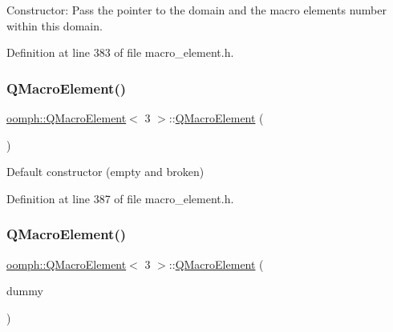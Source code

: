 Constructor\+: Pass the pointer to the domain and the macro element\textquotesingle{}s number within this domain. 



Definition at line 383 of file macro\+\_\+element.\+h.

\mbox{\label{classoomph_1_1QMacroElement_3_013_01_4_a52e55e172b74a1a9ea5888b5b06ac552}} 
\subsubsection{\texorpdfstring{Q\+Macro\+Element()}{QMacroElement()}\hspace{0.1cm}{\footnotesize\ttfamily [2/3]}}
{\footnotesize\ttfamily \hyperlink{classoomph_1_1QMacroElement}{oomph\+::\+Q\+Macro\+Element}$<$ 3 $>$\+::\hyperlink{classoomph_1_1QMacroElement}{Q\+Macro\+Element} (\begin{DoxyParamCaption}{ }\end{DoxyParamCaption})\hspace{0.3cm}{\ttfamily [inline]}}



Default constructor (empty and broken) 



Definition at line 387 of file macro\+\_\+element.\+h.

\mbox{\label{classoomph_1_1QMacroElement_3_013_01_4_adbcbf49dc3c075e2c6d0f00763f6035a}} 
\subsubsection{\texorpdfstring{Q\+Macro\+Element()}{QMacroElement()}\hspace{0.1cm}{\footnotesize\ttfamily [3/3]}}
{\footnotesize\ttfamily \hyperlink{classoomph_1_1QMacroElement}{oomph\+::\+Q\+Macro\+Element}$<$ 3 $>$\+::\hyperlink{classoomph_1_1QMacroElement}{Q\+Macro\+Element} (\begin{DoxyParamCaption}\item[{const \hyperlink{classoomph_1_1QMacroElement}{Q\+Macro\+Element}$<$ 3 $>$ \&}]{dummy }\end{DoxyParamCaption})\hspace{0.3cm}{\ttfamily [inline]}}



